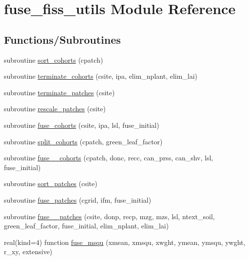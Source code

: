 \hypertarget{namespacefuse__fiss__utils}{}\section{fuse\+\_\+fiss\+\_\+utils Module Reference}
\label{namespacefuse__fiss__utils}
\subsection*{Functions/\+Subroutines}
\begin{DoxyCompactItemize}
\item 
subroutine \hyperlink{namespacefuse__fiss__utils_a31e4835d2465d1400c7cbbb51976b341}{sort\+\_\+cohorts} (cpatch)
\item 
subroutine \hyperlink{namespacefuse__fiss__utils_a5dc8f0ad95ff159ac69570ac55856524}{terminate\+\_\+cohorts} (csite, ipa, elim\+\_\+nplant, elim\+\_\+lai)
\item 
subroutine \hyperlink{namespacefuse__fiss__utils_a480df748f946b24daa940c15d72abfe2}{terminate\+\_\+patches} (csite)
\item 
subroutine \hyperlink{namespacefuse__fiss__utils_ab3b0eeed8a63cc2f4b866ac243e25ec6}{rescale\+\_\+patches} (csite)
\item 
subroutine \hyperlink{namespacefuse__fiss__utils_ad53341751380c44b17d1e7ec0a5ae824}{fuse\+\_\+cohorts} (csite, ipa, lsl, fuse\+\_\+initial)
\item 
subroutine \hyperlink{namespacefuse__fiss__utils_aba30221565235a7c9cdeadb079d324c5}{split\+\_\+cohorts} (cpatch, green\+\_\+leaf\+\_\+factor)
\item 
subroutine \hyperlink{namespacefuse__fiss__utils_a2fc600375d38f7ddcf60ebf5da725971}{fuse\+\_\+\_\+cohorts} (cpatch, donc, recc, can\+\_\+prss, can\+\_\+shv, lsl, fuse\+\_\+initial)
\item 
subroutine \hyperlink{namespacefuse__fiss__utils_a546d7beff2f991a07c8fbba91921ce5f}{sort\+\_\+patches} (csite)
\item 
subroutine \hyperlink{namespacefuse__fiss__utils_aee30640ff825246fb4c9f5f1f41470be}{fuse\+\_\+patches} (cgrid, ifm, fuse\+\_\+initial)
\item 
subroutine \hyperlink{namespacefuse__fiss__utils_ad3a8f1f374137c79a74aed4b42bca8a9}{fuse\+\_\+\_\+patches} (csite, donp, recp, mzg, mzs, lsl, ntext\+\_\+soil, green\+\_\+leaf\+\_\+factor, fuse\+\_\+initial, elim\+\_\+nplant, elim\+\_\+lai)
\item 
real(kind=4) function \hyperlink{namespacefuse__fiss__utils_aae52213c98fe3ffb3ecde24d8ffc6e03}{fuse\+\_\+msqu} (xmean, xmsqu, xwght, ymean, ymsqu, ywght, r\+\_\+xy, extensive)
\end{DoxyCompactItemize}


